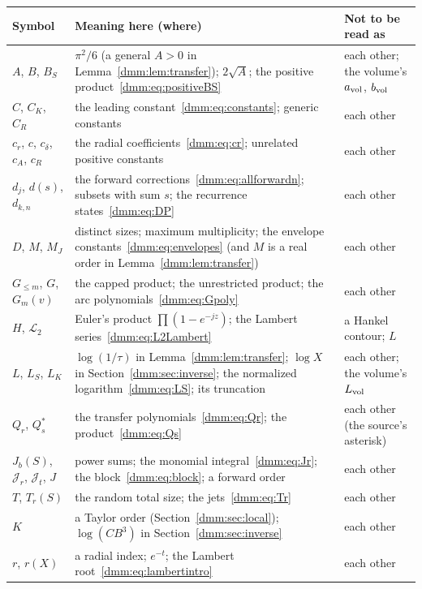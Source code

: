 \documentclass[11pt,letterpaper]{article}
\numberwithin{equation}{section}
\theoremstyle{definition}\newtheorem{definition}[theorem]{Definition}
\theoremstyle{remark}\newtheorem{remark}[theorem]{Remark}
\begin{document}
\begin{longtable}{@{}>{\raggedright\arraybackslash}p{0.95in}>{\raggedright\arraybackslash}p{3.45in}>{\raggedright\arraybackslash}p{1.7in}@{}}
\toprule
Symbol & Meaning here (where) & Not to be read as\\
\midrule
\endhead
$A$, $B$, $B_S$ & $\pi^2/6$ (a general $A>0$ in Lemma~\ref{dmm:lem:transfer}); $2\sqrt A$; the positive product~\eqref{dmm:eq:positiveBS} & each other; the volume's $a_{\rm vol}$, $b_{\rm vol}$\\
$C$, $C_K$, $C_R$ & the leading constant~\eqref{dmm:eq:constants}; generic constants & each other\\
$c_r$, $c$, $c_\delta$, $c_A$, $c_R$ & the radial coefficients~\eqref{dmm:eq:cr}; unrelated positive constants & each other\\
$d_j$, $d(s)$, $d_{k,n}$ & the forward corrections~\eqref{dmm:eq:allforwardn}; subsets with sum $s$; the recurrence states~\eqref{dmm:eq:DP} & each other\\
$D$, $M$, $M_J$ & distinct sizes; maximum multiplicity; the envelope constants~\eqref{dmm:eq:envelopes} (and $M$ is a real order in Lemma~\ref{dmm:lem:transfer}) & each other\\
$G_{\le m}$, $G$, $G_m(v)$ & the capped product; the unrestricted product; the arc polynomials~\eqref{dmm:eq:Gpoly} & each other\\
$H$, $\mathcal L_2$ & Euler's product $\prod(1-e^{-jz})$; the Lambert series~\eqref{dmm:eq:L2Lambert} & a Hankel contour; $L$\\
$L$, $L_S$, $L_K$ & $\log(1/\tau)$ in Lemma~\ref{dmm:lem:transfer}; $\log X$ in Section~\ref{dmm:sec:inverse}; the normalized logarithm~\eqref{dmm:eq:LS}; its truncation & each other; the volume's $L_{\rm vol}$\\
$Q_r$, $Q_s^*$ & the transfer polynomials~\eqref{dmm:eq:Qr}; the product~\eqref{dmm:eq:Qs} & each other (the source's asterisk)\\
$J_b(S)$, $\mathcal J_r$, $\mathcal J_t$, $J$ & power sums; the monomial integral~\eqref{dmm:eq:Jr}; the block~\eqref{dmm:eq:block}; a forward order & each other\\
$T$, $T_r(S)$ & the random total size; the jets~\eqref{dmm:eq:Tr} & each other\\
$K$ & a Taylor order (Section~\ref{dmm:sec:local}); $\log(CB^3)$ in Section~\ref{dmm:sec:inverse} & each other\\
$r$, $r(X)$ & a radial index; $e^{-t}$; the Lambert root~\eqref{dmm:eq:lambertintro} & each other\\

\end{longtable}
\end{document}
